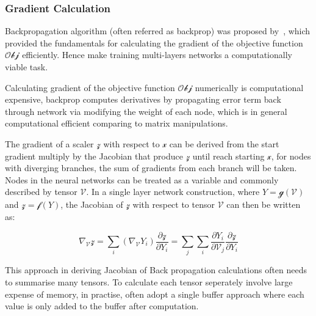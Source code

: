 \subsubsection{Gradient Calculation}
Backpropagation algorithm (often referred as backprop) was proposed by~\citet{werbos1975beyond}, which provided the fundamentals for calculating the gradient of the objective function $\mathcal{Obj}$ efficiently. Hence make training multi-layers networks a computationally viable task. 
\par
Calculating gradient of the objective function $\mathcal{Obj}$ numerically is computational expensive, backprop computes derivatives by propagating error term back through network via modifying the weight of each node, which is in general computational efficient comparing to matrix manipulations. 
\par
The gradient of a scaler $\mathcal{z}$ with respect to $\mathcal{x}$ can be derived from the start gradient multiply by the Jacobian that produce $\mathcal{z}$ until reach starting $\mathcal{x}$, for nodes with diverging branches, the sum of gradients from each branch will be taken. Nodes in the neural networks can be treated as a variable and commonly described by tensor $\mathcal{V}$. In a single layer network construction, where $Y=\mathcal{g}(\mathcal{V})$ and $\mathcal{z} = \mathcal{f}(Y)$, the Jacobian of $\mathcal{z}$ with respect to tensor $\mathcal{V}$ can then be written as:

\begin{equation}
    \nabla_{\mathcal{V}}\mathcal{z} = \sum_i (\nabla_{\mathcal{\mathcal{V}}} Y_i)\frac{\partial\mathcal{z}}{\partial Y_i} = \sum_j \sum_i \frac{\partial Y_i} {\partial{\mathcal{V}}_j}\frac{\partial\mathcal{z}}{\partial Y_i}
\end{equation}

This approach in deriving Jacobian of 
Back propagation calculations often needs to summarise many tensors. To calculate each tensor seperately involve large expense of memory, in practise, often adopt a single buffer approach where each value is only added to the buffer after computation.